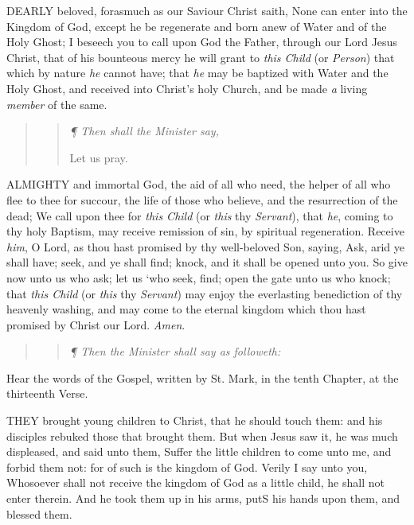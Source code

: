 DEARLY
beloved, forasmuch as our Saviour Christ saith, None can enter into the
Kingdom of God, except he be regenerate and born anew of Water and of
the Holy Ghost; I beseech you to call upon God the Father, through our
Lord Jesus Christ, that of his bounteous mercy he will grant to \emph{this
Child} (or \emph{Person}) that which by nature \emph{he} cannot
have; that \emph{he} may be baptized with Water and the Holy Ghost,
and received into Christ’s holy Church, and be made \emph{a} living
\emph{member} of the same.

\begin{quote}

\begin{quote}

\emph{¶ Then shall the Minister say,}

Let
us pray.

\end{quote}

\end{quote}

ALMIGHTY
and immortal God, the aid of all who need, the helper of all who flee
to thee for succour, the life of those who believe, and the resurrection
of the dead; We call upon thee for \emph{this Child} (or \emph{this}
thy \emph{Servant}), that \emph{he}, coming to thy holy Baptism, may
receive remission of sin, by spiritual regeneration. Receive \emph{him},
O Lord, as thou hast promised by thy well-beloved Son, saying, Ask, arid
ye shall have; seek, and ye shall find; knock, and it shall be opened
unto you. So give now unto us who ask; let us ‘who seek, find; open
the gate unto us who knock; that \emph{this Child} (or \emph{this}
thy \emph{Servant}) may enjoy the everlasting benediction of thy heavenly
washing, and may come to the eternal kingdom which thou hast promised
by Christ our Lord. \emph{Amen}.

\begin{quote}

\begin{quote}

\emph{¶
Then the Minister shall say as followeth:}

\end{quote}

\end{quote}

Hear the words of the Gospel, written by St. Mark, in the tenth Chapter,
at the thirteenth Verse.

THEY
brought young children to Christ, that he should touch them: and his disciples
rebuked those that brought them. But when Jesus saw it, he was much displeased,
and said unto them, Suffer the little children to come unto me, and forbid
them not: for of such is the kingdom of God. Verily I say unto you, Whosoever
shall not receive the kingdom of God as a little child, he shall not enter
therein. And he took them up in his arms, putS his hands upon them, and
blessed them.

